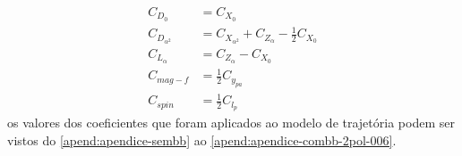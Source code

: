 \begin{align}
    C_{D_{0}} &= C_{X_{0}} \\
    C_{D_{\alpha^2}} &= C_{X_{\alpha^2}} + C_{Z_{\alpha}} - \frac{1}{2}C_{X_{0}}\\
    C_{L_{\alpha}} &= C_{Z_{\alpha}} - C_{X_{0}} \\
    C_{mag-f} &= \frac{1}{2}C_{y_{pa}} \\
    C_{spin} &= \frac{1}{2}C_{l_{p}}
\end{align}
%
os valores dos coeficientes que foram aplicados ao modelo de trajetória podem ser vistos do \autoref{apend:apendice-sembb} ao \autoref{apend:apendice-combb-2pol-006}.